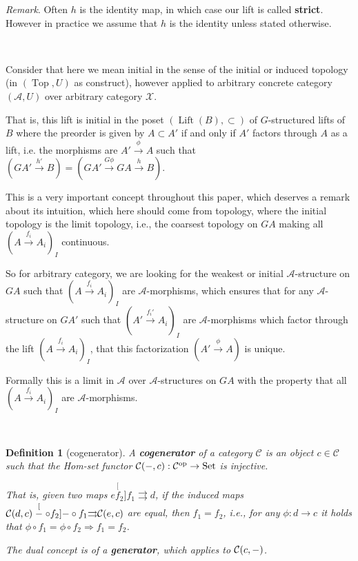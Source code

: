 \documentclass[12pt,a4paper]{article}
\newtheorem{definition}{Definition}[section] %
\DeclareMathOperator{\Set}{Set}
\DeclareMathOperator{\Top}{Top}
\DeclareMathOperator{\Lift}{Lift}
\DeclareMathOperator{\op}{op}
\def\HomC{\ensuremath\mathcal{C}}
\begin{document}
\emph{Remark}. Often $h$ is the identity map, in which case our lift is called \textbf{strict}. However in practice we assume that $h$ is the identity unless stated otherwise.

\

Consider that here we mean initial in the sense of the initial or induced topology (in $(\Top, U)$ as  construct), however applied to arbitrary concrete category $(\mathcal{A}, U)$ over arbitrary category $\mathcal{X}$. 

That is, this lift is initial in the poset $(\Lift(B), \subset)$  of $G$-structured lifts of $B$ where the preorder is given by $A\subset A'$ if and only if $A'$ factors through $A$ as a lift, i.e. the morphisms are $A' \stackrel{\phi}{\to} A$ such that $(GA' \stackrel{h'}{\to}B) = (GA' \stackrel{G\phi}{\to}GA\stackrel{h}{\to}B) $. 

This is a very important concept throughout this paper, which deserves a remark about its intuition, which here should come from topology, where the initial topology is the limit topology, i.e., the coarsest topology on $GA$ making all $(A \stackrel{f_i}{\to}A_i)_I$ continuous. 

So for arbitrary category, we are looking for the weakest or initial $\mathcal{A}$-structure on $GA$ such that $(A \stackrel{f_i}{\to}A_i)_I$ are $\mathcal{A}$-morphisms, which ensures that for any $\mathcal{A}$-structure on $GA'$ such that $(A' \stackrel{f_i'}{\to}A_i)_I$ are $\mathcal{A}$-morphisms which factor through the lift $(A\stackrel{f_i}{\to} A_i)_I$, that this factorization $(A' \stackrel{\phi}{\to}A)$ is unique.
 
Formally this is a limit  in $\mathcal{A}$ over $\mathcal{A}$-structures on $GA$ with the property that all $(A \stackrel{f_i}{\to}A_i)_I$ are $\mathcal{A}$-morphisms.

\

\begin{definition}[cogenerator]
A \textbf{cogenerator} of a category $\mathcal{C}$ is an object $c \in \mathcal{C}$ such that the Hom-set functor $\HomC(-, c): \mathcal{C}^{\op} \to \Set$ is injective.

That is, given two maps $e \stackrel[f_2]{f_1}{\rightrightarrows} d$, if the induced maps $\HomC(d, c) \stackrel[- \circ f_2]{- \circ f_1}{\rightrightarrows}  \HomC(e,c)$ are equal, then $f_1 = f_2$, i.e., for any $\phi: d \to c$ it holds that $\phi \circ f_1 = \phi \circ f_2 \Rightarrow f_1 = f_2$. 

The dual concept is of a \textbf{generator}, which applies to $\HomC(c, -)$.
\end{definition}
\end{document}

